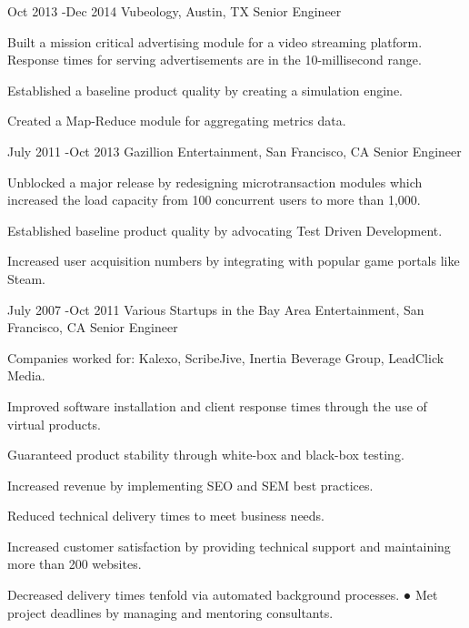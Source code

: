 \documentclass[10pt]{article} %
\begin{document}

\job
{Oct 2013 -}{Dec 2014}
{Vubeology, Austin, TX}
{}
{Senior Engineer}
{
\begin{itemize-noindent}
\item{Built a mission critical advertising module for a video streaming platform. Response times for serving advertisements are in the 10-millisecond range.} 
\item{Established a baseline product quality by creating a simulation engine.} 
\item{Created a Map-Reduce module for aggregating metrics data.}
\end{itemize-noindent}
}


\job
{July 2011 -}{Oct 2013}
{Gazillion Entertainment, San Francisco, CA}
{}
{Senior Engineer}
{
\begin{itemize-noindent}

\item{Unblocked a major release by redesigning microtransaction modules which increased the load capacity from 100 concurrent users to more than 1,000.}
\item{Established baseline product quality by advocating Test Driven Development.}
\item{Increased user acquisition numbers by integrating with popular game portals like Steam.} 
\end{itemize-noindent}
}


\job
{July 2007 -}{Oct 2011}
{Various Startups in the Bay Area Entertainment, San Francisco, CA}
{}
{Senior Engineer}
{
\begin{itemize-noindent}

\item{Companies worked for: Kalexo, ScribeJive, Inertia Beverage Group, LeadClick Media.} 
\item{Improved software installation and client response times through the use of virtual products.}
\item{Guaranteed product stability through white-box and black-box testing.}
\item{Increased revenue by implementing SEO and SEM best practices.}
\item{Reduced technical delivery times to meet business needs.} 
\item{Increased customer satisfaction by providing technical support and maintaining more than 200 websites.}
\item{Decreased delivery times tenfold via automated background processes. ● Met project deadlines by managing and mentoring consultants.}

\end{itemize-noindent}
}
\end{document}
